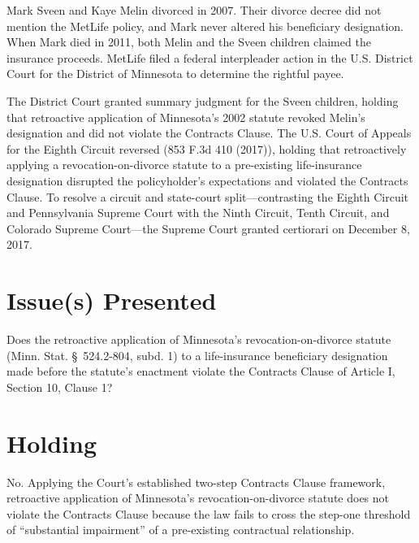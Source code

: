\documentclass[12pt]{article}
\begin{document}
Mark Sveen and Kaye Melin divorced in 2007. Their divorce decree did not mention the MetLife policy, and Mark never altered his beneficiary designation. When Mark died in 2011, both Melin and the Sveen children claimed the insurance proceeds. MetLife filed a federal interpleader action in the U.S. District Court for the District of Minnesota to determine the rightful payee.

The District Court granted summary judgment for the Sveen children, holding that retroactive application of Minnesota's 2002 statute revoked Melin's designation and did not violate the Contracts Clause. The U.S. Court of Appeals for the Eighth Circuit reversed (853 F.3d 410 (2017)), holding that retroactively applying a revocation-on-divorce statute to a pre-existing life-insurance designation disrupted the policyholder's expectations and violated the Contracts Clause. To resolve a circuit and state-court split---contrasting the Eighth Circuit and Pennsylvania Supreme Court with the Ninth Circuit, Tenth Circuit, and Colorado Supreme Court---the Supreme Court granted certiorari on December 8, 2017.

\section{Issue(s) Presented}
Does the retroactive application of Minnesota's revocation-on-divorce statute (Minn. Stat. \S~524.2-804, subd. 1) to a life-insurance beneficiary designation made before the statute's enactment violate the Contracts Clause of Article I, Section 10, Clause 1?

\section{Holding}
No. Applying the Court's established two-step Contracts Clause framework, retroactive application of Minnesota's revocation-on-divorce statute does not violate the Contracts Clause because the law fails to cross the step-one threshold of ``substantial impairment'' of a pre-existing contractual relationship.
\end{document}
